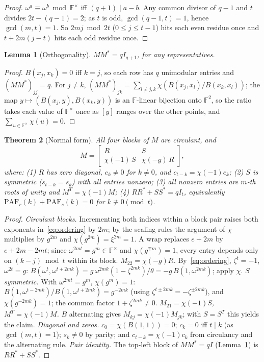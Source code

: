 \documentclass[11pt]{article}
\theoremstyle{plain}
\newtheorem{theorem}{Theorem}[section]
\newtheorem{lemma}[theorem]{Lemma}
\theoremstyle{definition}
\theoremstyle{remark}
\newcommand{\F}{\mathbb F}
\newcommand{\paf}{\mathrm{PAF}}
\begin{document}
\begin{proof}
$\omega^a\equiv\omega^b\bmod\F^\times$ iff $(q+1)\mid a-b$. Any common divisor of
$q-1$ and $t$ divides $2t-(q-1)=2$; as $t$ is odd, $\gcd(q-1,t)=1$, hence
$\gcd(m,t)=1$. So $2mj\bmod2t$ ($0\le j\le t-1$) hits each even residue once and
$t+2m(j-t)$ hits each odd residue once.
\end{proof}

\begin{lemma}[Orthogonality]\label{lem:orth}
$MM^*=qI_{q+1}$, for any representatives.
\end{lemma}

\begin{proof}
$B(x_j,x_k)=0$ iff $k=j$, so each row has $q$ unimodular entries and
$(MM^*)_{jj}=q$. For $j\ne k$,
$(MM^*)_{jk}=\sum_{l\ne j,k}\chi(B(x_j,x_l)/B(x_k,x_l))$; the map
$y\mapsto(B(x_j,y),B(x_k,y))$ is an $\F$-linear bijection onto $\F^2$, so the
ratio takes each value of $\F^\times$ once as $[y]$ ranges over the other
points, and $\sum_{u\in\F^\times}\chi(u)=0$.
\end{proof}

\begin{theorem}[Normal form]\label{thm:normalform}
All four blocks of $M$ are circulant, and
\[
  M=\begin{bmatrix} R & S\\ \chi(-1)\,S & \chi(-g)\,R\end{bmatrix},
\]
where: \emph{(1)} $R$ has zero diagonal, $c_k\ne0$ for $k\ne0$, and
$c_{t-k}=\chi(-1)c_k$; \emph{(2)} $S$ is symmetric ($s_{t-k}=s_k$) with all
entries nonzero; \emph{(3)} all nonzero entries are $m$-th roots of unity and
$M^T=\chi(-1)M$; \emph{(4)} $RR^*+SS^*=qI_t$, equivalently
$\paf_r(k)+\paf_s(k)=0$ for $k\not\equiv0\pmod t$.
\end{theorem}

\begin{proof}
\emph{Circulant blocks.} Incrementing both indices within a block pair raises
both exponents in~\eqref{eq:ordering} by $2m$; by the scaling rules the argument
of $\chi$ multiplies by $g^{2m}$ and $\chi(g^{2m})=\xi^{2m}=1$. A wrap replaces
$e+2m$ by $e+2m-2mt$; since $\omega^{2mt}=g^m\in\F^\times$ and $\chi(g^{\mp m})=1$,
every entry depends only on $(k-j)\bmod t$ within its block.
\emph{$M_{22}=\chi(-g)R$.} By~\eqref{eq:ordering}, $\zeta^t=-1$, $\omega^{2t}=g$:
$B(\omega^t,\omega^{t+2mk})=g\,\omega^{2mk}(1-\zeta^{2mk})/\theta=-g\,B(1,\omega^{2mk})$;
apply $\chi$. \emph{$S$ symmetric.} With $\omega^{2mt}=g^m$, $\chi(g^m)=1$:
$B(1,\omega^{t-2mk})/B(1,\omega^{t+2mk})=g^{-2mk}$ (using
$\zeta^{t\pm2mk}=-\zeta^{\pm2mk}$), and $\chi(g^{-2mk})=1$; the common factor
$1+\zeta^{2mk}\ne0$. \emph{$M_{21}=\chi(-1)S$, $M^T=\chi(-1)M$.} $B$ alternating
gives $M_{kj}=\chi(-1)M_{jk}$; with $S=S^T$ this yields the claim. \emph{Diagonal
and zeros.} $c_0=\chi(B(1,1))=0$; $c_k=0$ iff $t\mid k$ (as $\gcd(m,t)=1$);
$s_k\ne0$ by parity; and $c_{t-k}=\chi(-1)c_k$ from circulancy and the
alternating rule. \emph{Pair identity.} The top-left block of $MM^*=qI$
(Lemma~\ref{lem:orth}) is $RR^*+SS^*$.
\end{proof}
\end{document}
